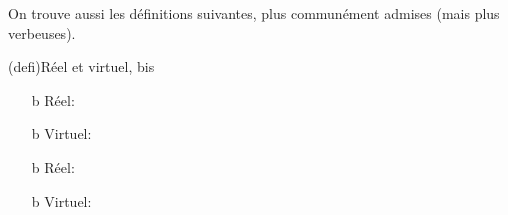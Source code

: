 \documentclass[../../main/main.tex]{subfiles}
\begin{document}
On trouve aussi les définitions suivantes, plus communément admises (mais plus
verbeuses).

\begin{tcb*}[label=reelvirt2, sidebyside](defi){{Réel et virtuel, bis}}
	\begin{itemize}[label=$\diamond$, leftmargin=10pt]
		\item[b]{Réel}: 
		\item[b]{Virtuel}: 
	\end{itemize}
	\tcblower
	\begin{itemize}[label=$\diamond$, leftmargin=10pt]
		\item[b]{Réel}: 
		\item[b]{Virtuel}: 
	\end{itemize}
\end{tcb*}
\end{document}
